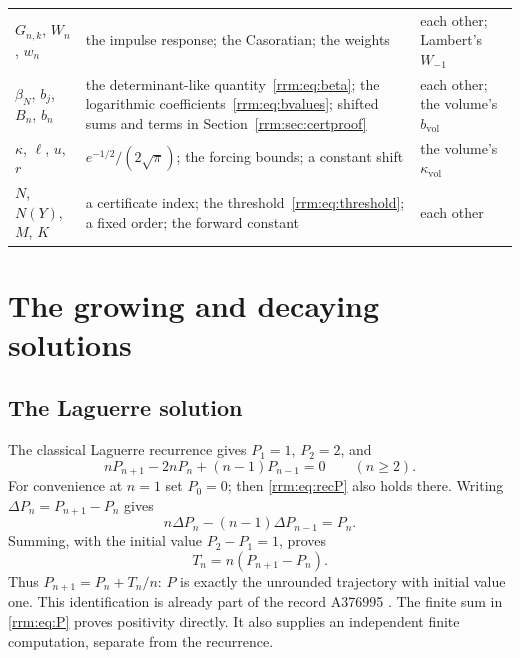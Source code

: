 \documentclass[11pt]{article}
\theoremstyle{remark}\newtheorem{remark}[theorem]{Remark}
\begin{document}
\begin{longtable}{@{}>{\raggedright\arraybackslash}p{0.95in}>{\raggedright\arraybackslash}p{3.3in}>{\raggedright\arraybackslash}p{1.85in}@{}}
$G_{n,k}$, $W_n$, $w_n$ & the impulse response; the Casoratian; the weights & each other; Lambert's $W_{-1}$\\
$\beta_N$, $b_j$, $B_n$, $b_n$ & the determinant-like quantity~\eqref{rrm:eq:beta}; the logarithmic coefficients~\eqref{rrm:eq:bvalues}; shifted sums and terms in Section~\ref{rrm:sec:certproof} & each other; the volume's $b_{\mathrm{vol}}$\\
$\kappa$, $\ell$, $u$, $r$ & $e^{-1/2}/(2\sqrt\pi)$; the forcing bounds; a constant shift & the volume's $\kappa_{\mathrm{vol}}$\\
$N$, $N(Y)$, $M$, $K$ & a certificate index; the threshold~\eqref{rrm:eq:threshold}; a fixed order; the forward constant & each other\\
\bottomrule
\end{longtable}
\endgroup

\section{The growing and decaying solutions}\label{rrm:sec:fundamental}
\subsection{The Laguerre solution}
The classical Laguerre recurrence gives $P_1=1$, $P_2=2$, and
\begin{equation}\label{rrm:eq:recP}
 nP_{n+1}-2nP_n+(n-1)P_{n-1}=0\qquad(n\ge2).
\end{equation}
For convenience at $n=1$ set $P_0=0$; then \eqref{rrm:eq:recP} also holds there. Writing $\Delta P_n=P_{n+1}-P_n$ gives
\[
 n\Delta P_n-(n-1)\Delta P_{n-1}=P_n.
\]
Summing, with the initial value $P_2-P_1=1$, proves
\begin{equation}\label{rrm:eq:T}
 T_n=n(P_{n+1}-P_n).
\end{equation}
Thus $P_{n+1}=P_n+T_n/n$: $P$ is exactly the unrounded trajectory with initial value one. This identification is already part of the record A376995 \cite{oeisunrounded}. The finite sum in \eqref{rrm:eq:P} proves positivity directly. It also supplies an independent finite computation, separate from the recurrence.
\end{document}
